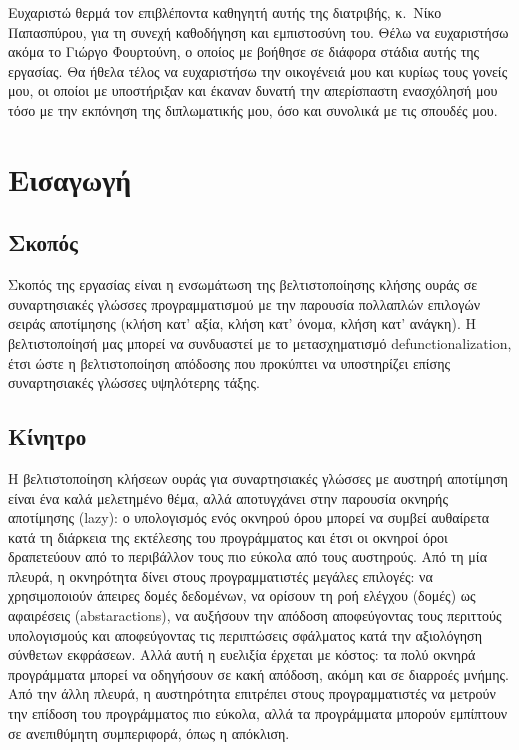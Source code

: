 \documentclass[diploma]{softlab-thesis}
\begin{document}

\begin{acknowledgementsgr}
Ευχαριστώ θερμά τον επιβλέποντα καθηγητή αυτής της διατριβής,
κ.~Νίκο Παπασπύρου, για τη συνεχή καθοδήγηση και εμπιστοσύνη
του. Θέλω να ευχαριστήσω ακόμα
το Γιώργο Φουρτούνη, ο οποίος με βοήθησε σε
διάφορα στάδια αυτής της εργασίας.  Θα ήθελα τέλος να ευχαριστήσω
την οικογένειά μου και κυρίως τους γονείς μου, οι οποίοι με
υποστήριξαν και έκαναν δυνατή την απερίσπαστη ενασχόλησή μου τόσο
με την εκπόνηση της διπλωματικής μου, όσο και συνολικά με τις
σπουδές μου.
\end{acknowledgementsgr}



\tableofcontents
\listoffigures



\mainmatter

\chapter{Εισαγωγή}


\section{Σκοπός}
Σκοπός της εργασίας είναι η ενσωμάτωση της βελτιστοποίησης κλήσης ουράς σε συναρτησιακές γλώσσες 
προγραμματισμού με την παρουσία πολλαπλών επιλογών σειράς αποτίμησης 
(κλήση κατ' αξία, κλήση κατ' όνομα, κλήση κατ' ανάγκη). Η βελτιστοποίησή μας μπορεί να συνδυαστεί με το
μετασχηματισμό defunctionalization, έτσι ώστε η 
βελτιστοποίηση απόδοσης που προκύπτει να υποστηρίζει επίσης συναρτησιακές γλώσσες υψηλότερης τάξης.

\section{Κίνητρο}

Η βελτιστοποίηση κλήσεων ουράς για συναρτησιακές γλώσσες με αυστηρή αποτίμηση είναι ένα καλά 
μελετημένο θέμα, αλλά αποτυγχάνει στην
παρουσία οκνηρής αποτίμησης (lazy): ο υπολογισμός ενός οκνηρού όρου μπορεί να συμβεί αυθαίρετα 
κατά τη διάρκεια της εκτέλεσης
του προγράμματος και έτσι οι οκνηροί όροι δραπετεύουν από το περιβάλλον τους 
πιο εύκολα από τους αυστηρούς.
Από τη μία πλευρά, η οκνηρότητα δίνει στους προγραμματιστές μεγάλες επιλογές: 
να χρησιμοποιούν άπειρες δομές δεδομένων,
να ορίσουν τη ροή ελέγχου (δομές) ως αφαιρέσεις (abstaractions), 
να αυξήσουν την απόδοση
αποφεύγοντας τους περιττούς υπολογισμούς και αποφεύγοντας τις περιπτώσεις σφάλματος 
κατά την αξιολόγηση σύνθετων εκφράσεων.
Αλλά αυτή η ευελιξία έρχεται με κόστος: τα πολύ οκνηρά προγράμματα μπορεί 
να οδηγήσουν σε κακή απόδοση, ακόμη και σε διαρροές μνήμης.
Από την άλλη πλευρά, η αυστηρότητα επιτρέπει στους προγραμματιστές να μετρούν
την επίδοση του προγράμματος πιο εύκολα, αλλά τα προγράμματα μπορούν
εμπίπτουν σε ανεπιθύμητη συμπεριφορά, όπως η απόκλιση.
\end{document}
